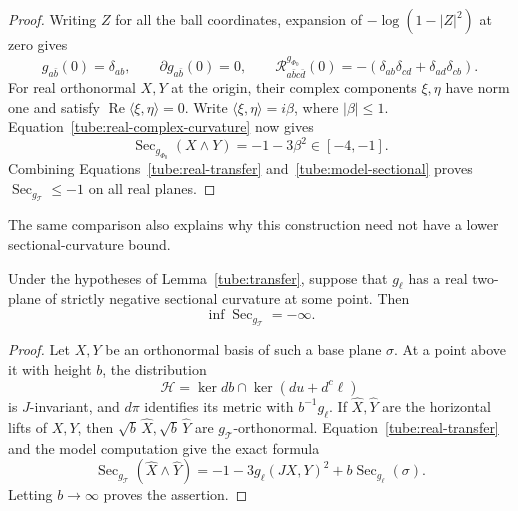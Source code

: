 \begin{proof}
Writing $Z$ for all the ball coordinates, expansion of
$-\log(1-|Z|^2)$ at zero gives
\[
 g_{a\bar b}(0)=\delta_{ab},\qquad
 \partial g_{a\bar b}(0)=0,\qquad
 \mathcal R^{g_{\Phi_0}}_{a\bar b c\bar d}(0)
 =-(\delta_{ab}\delta_{cd}+\delta_{ad}\delta_{cb}).
\]
For real orthonormal $X,Y$ at the origin, their complex components
$\xi,\eta$ have norm one and satisfy
$\operatorname{Re}\langle\xi,\eta\rangle=0$.  Write
$\langle\xi,\eta\rangle=i\beta$, where $|\beta|\le1$.
Equation~\eqref{tube:real-complex-curvature} now gives
\begin{equation}\label{tube:model-sectional}
 \operatorname{Sec}_{g_{\Phi_0}}(X\wedge Y)
 =-1-3\beta^2\in[-4,-1].
\end{equation}
Combining Equations~\eqref{tube:real-transfer}
and~\eqref{tube:model-sectional} proves
$\operatorname{Sec}_{g_{\mathcal T}}\le-1$ on all real planes.
\end{proof}

The same comparison also explains why this construction need not
have a lower sectional-curvature bound.

\begin{corollary}\label{tube:negative-plane}
Under the hypotheses of Lemma~\ref{tube:transfer}, suppose that
$g_\ell$ has a real two-plane of strictly negative sectional
curvature at some point.  Then
\[
 \inf\operatorname{Sec}_{g_{\mathcal T}}=-\infty.
\]
\end{corollary}

\begin{proof}
Let $X,Y$ be an orthonormal basis of such a base plane $\sigma$.
At a point above it with height $b$, the distribution
\[
 \mathcal H=\ker db\cap\ker(du+d^c\ell)
\]
is $J$-invariant, and $d\pi$ identifies its metric with
$b^{-1}g_\ell$.  If $\widehat X,\widehat Y$ are the horizontal lifts
of $X,Y$, then $\sqrt b\,\widehat X,\sqrt b\,\widehat Y$ are
$g_{\mathcal T}$-orthonormal.  Equation~\eqref{tube:real-transfer}
and the model computation give the exact formula
\[
 \operatorname{Sec}_{g_{\mathcal T}}
   (\widehat X\wedge\widehat Y)
 =-1-3g_\ell(JX,Y)^2+b\operatorname{Sec}_{g_\ell}(\sigma).
\]
Letting $b\to\infty$ proves the assertion.
\end{proof}
